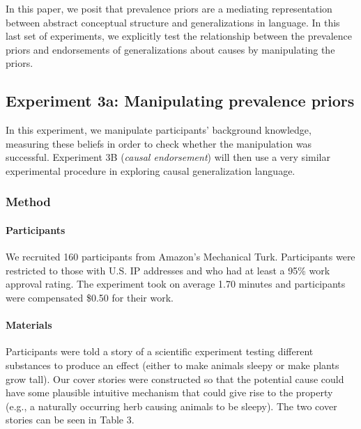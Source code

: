 \documentclass[english,,man,floatsintext]{apa6}
\let\oldparagraph\paragraph
\renewcommand{\paragraph}[1]{\oldparagraph{#1}\mbox{}}
\theoremstyle{definition}
\theoremstyle{definition}
\theoremstyle{definition}
\theoremstyle{remark}
\begin{document}
In this paper, we posit that prevalence priors are a mediating
representation between abstract conceptual structure and generalizations
in language. In this last set of experiments, we explicitly test the
relationship between the prevalence priors and endorsements of
generalizations about causes by manipulating the priors.

\hypertarget{experiment-3a-manipulating-prevalence-priors}{%
\subsection{Experiment 3a: Manipulating prevalence
priors}\label{experiment-3a-manipulating-prevalence-priors}}

In this experiment, we manipulate participants' background knowledge,
measuring these beliefs in order to check whether the manipulation was
successful. Experiment 3B (\emph{causal endorsement}) will then use a
very similar experimental procedure in exploring causal generalization
language.

\hypertarget{method-5}{%
\subsubsection{Method}\label{method-5}}

\hypertarget{participants-5}{%
\paragraph{Participants}\label{participants-5}}

We recruited 160 participants from Amazon's Mechanical Turk.
Participants were restricted to those with U.S. IP addresses and who had
at least a 95\% work approval rating. The experiment took on average
1.70 minutes and participants were compensated \$0.50 for their work.

\hypertarget{materials-3}{%
\paragraph{Materials}\label{materials-3}}

Participants were told a story of a scientific experiment testing
different substances to produce an effect (either to make animals sleepy
or make plants grow tall). Our cover stories were constructed so that
the potential cause could have some plausible intuitive mechanism that
could give rise to the property (e.g., a naturally occurring herb
causing animals to be sleepy). The two cover stories can be seen in
Table 3.
\end{document}
